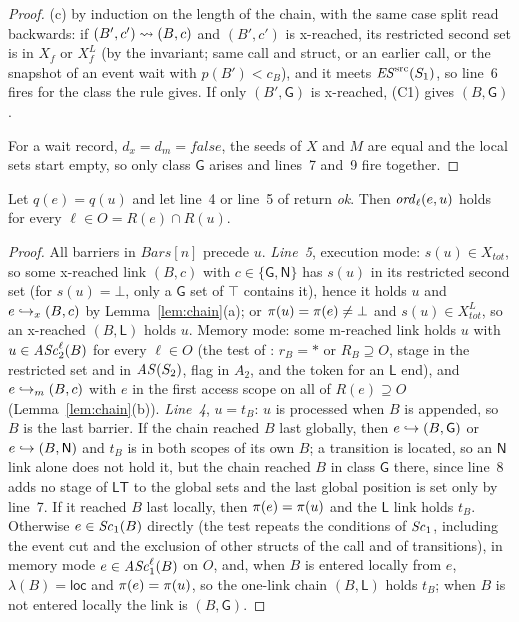 \begin{proof}
(c) by induction on the length of the chain, with the same case split read backwards: if $(B',c') \rightsquigarrow (B,c)$ and
$(B',c')$ is x-reached, its restricted second set is in $X_f$ or $X^L_f$ (by the invariant; same call and struct, or
an earlier call, or the snapshot of an event wait with $p(B') < c_B$), and it meets $\mathit{ES}^{\mathrm{src}}(S_1)$, so line~6 fires for
the class the rule gives. If only $(B',\mathsf{G})$ is x-reached, (C1) gives $(B,\mathsf{G})$.

For a wait record, $d_x = d_m = \mathit{false}$, the seeds of $X$ and $M$ are equal and the local sets start empty,
so only class $\mathsf{G}$ arises and lines~7 and~9 fire together.
\end{proof}

\begin{lemma}\label{lem:same}
Let $q(e) = q(u)$ and let line~4 or line~5 of  return \emph{ok}. Then $\mathit{ord}_{\ell}(e,u)$ holds for every
$\ell \in O = R(e) \cap R(u)$.
\end{lemma}
\begin{proof}
All barriers in $\mathit{Bars}[n]$ precede $u$. \emph{Line~5}, execution mode: $s(u) \in X_{\mathit{tot}}$, so some
x-reached link $(B,c)$ with $c \in \{\mathsf{G},\mathsf{N}\}$ has $s(u)$ in its restricted second set (for $s(u) =
\bot$, only a $\mathsf{G}$ set of $\top$ contains it), hence it holds $u$ and $e \hookrightarrow_x (B,c)$ by
Lemma~\ref{lem:chain}(a); or $\pi(u) = \pi(e) \ne \bot$ and $s(u) \in X^L_{\mathit{tot}}$, so an x-reached
$(B,\mathsf{L})$ holds $u$. Memory mode: some m-reached link holds $u$ with $u \in \mathit{ASc}_{2}^{\ell}(B)$ for every $\ell
\in O$ (the test of : $r_B = \ast$ or $R_B \supseteq O$, stage in the restricted set and in $\mathit{AS}(S_2)$,
flag in $A_2$, and the token for an $\mathsf{L}$ end), and $e \hookrightarrow_m (B,c)$ with $e$ in the first access scope on
all of $R(e) \supseteq O$ (Lemma~\ref{lem:chain}(b)).
\emph{Line~4}, $u = t_B$: $u$ is processed when $B$ is appended, so $B$ is the last barrier. If the chain reached $B$
last globally, then $e \hookrightarrow (B,\mathsf{G})$ or $e \hookrightarrow (B,\mathsf{N})$ and $t_B$ is in both scopes of its own $B$;
a transition is located, so an $\mathsf{N}$ link alone does not hold it, but the chain reached $B$ in class
$\mathsf{G}$ there, since line~8 adds no stage of $\mathsf{LT}$ to the global sets and the last global position is set
only by line~7. If it reached $B$ last locally, then $\pi(e) = \pi(u)$ and the $\mathsf{L}$ link holds $t_B$.
Otherwise $e \in \mathit{Sc}_{1}(B)$ directly (the test repeats the conditions of $\mathit{Sc}_{1}$, including the event cut and the
exclusion of other structs of the call and of transitions), in memory mode $e \in \mathit{ASc}_{1}^{\ell}(B)$ on $O$, and, when
$B$ is entered locally from $e$, $\lambda(B) = \mathsf{loc}$ and $\pi(e) = \pi(u)$, so the one-link chain
$(B,\mathsf{L})$ holds $t_B$; when $B$ is not entered locally the link is $(B,\mathsf{G})$.
\end{proof}

